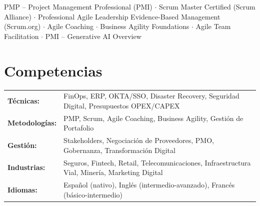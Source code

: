 \documentclass[11pt,letterpaper]{article}
\begin{document}
\noindent PMP -- Project Management Professional (PMI) $\cdot$ Scrum Master Certified (Scrum Alliance) $\cdot$ Professional Agile Leadership Evidence-Based Management (Scrum.org) $\cdot$ Agile Coaching $\cdot$ Business Agility Foundations $\cdot$ Agile Team Facilitation $\cdot$ PMI -- Generative AI Overview

\section{Competencias}

\begin{tabularx}{\textwidth}{@{}l X@{}}
\textbf{T\'{e}cnicas:} & FinOps, ERP, OKTA/SSO, Disaster Recovery, Seguridad Digital, Presupuestos OPEX/CAPEX \\
\textbf{Metodolog\'{i}as:} & PMP, Scrum, Agile Coaching, Business Agility, Gesti\'{o}n de Portafolio \\
\textbf{Gesti\'{o}n:} & Stakeholders, Negociaci\'{o}n de Proveedores, PMO, Gobernanza, Transformaci\'{o}n Digital \\
\textbf{Industrias:} & Seguros, Fintech, Retail, Telecomunicaciones, Infraestructura Vial, Miner\'{i}a, Marketing Digital \\
\textbf{Idiomas:} & Espa\~{n}ol (nativo), Ingl\'{e}s (intermedio-avanzado), Franc\'{e}s (b\'{a}sico-intermedio) \\
\end{tabularx}
\end{document}
